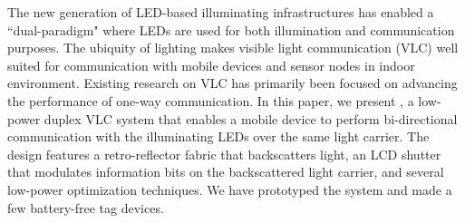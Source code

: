 The new generation of LED-based illuminating infrastructures has enabled a ``dual-paradigm" where LEDs are used for both illumination and communication purposes. The ubiquity of lighting makes visible light communication (VLC) well suited for communication with mobile devices and sensor nodes in indoor environment.
Existing research on VLC has primarily been focused on advancing the performance of one-way communication. %
In this paper, we present \retro, a low-power duplex VLC system that enables a mobile device to perform bi-directional communication with the illuminating LEDs over the same light carrier. The design features a retro-reflector fabric that backscatters light, an LCD shutter that modulates information bits on the backscattered light carrier, and several low-power optimization techniques. We have prototyped the  system and made a few battery-free tag devices.  

